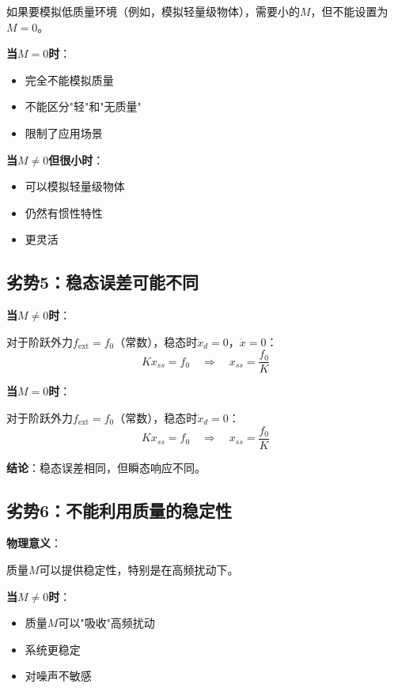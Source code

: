 \documentclass[12pt,a4paper]{article}
\begin{document}
如果要模拟低质量环境（例如，模拟轻量级物体），需要小的$M$，但不能设置为$M = 0$。

\textbf{当$M = 0$时}：
\begin{itemize}
\item 完全不能模拟质量
\item 不能区分"轻"和"无质量"
\item 限制了应用场景
\end{itemize}

\textbf{当$M \neq 0$但很小时}：
\begin{itemize}
\item 可以模拟轻量级物体
\item 仍然有惯性特性
\item 更灵活
\end{itemize}

\subsection{劣势5：稳态误差可能不同}

\textbf{当$M \neq 0$时}：

对于阶跃外力$f_{\text{ext}} = f_0$（常数），稳态时$\ddot{x}_d = 0$，$\dot{x} = 0$：
\begin{equation}
Kx_{ss} = f_0 \quad \Rightarrow \quad x_{ss} = \frac{f_0}{K}
\end{equation}

\textbf{当$M = 0$时}：

对于阶跃外力$f_{\text{ext}} = f_0$（常数），稳态时$\dot{x}_d = 0$：
\begin{equation}
Kx_{ss} = f_0 \quad \Rightarrow \quad x_{ss} = \frac{f_0}{K}
\end{equation}

\textbf{结论}：稳态误差相同，但瞬态响应不同。

\subsection{劣势6：不能利用质量的稳定性}

\textbf{物理意义}：

质量$M$可以提供稳定性，特别是在高频扰动下。

\textbf{当$M \neq 0$时}：
\begin{itemize}
\item 质量$M$可以"吸收"高频扰动
\item 系统更稳定
\item 对噪声不敏感
\end{itemize}
\end{document}
